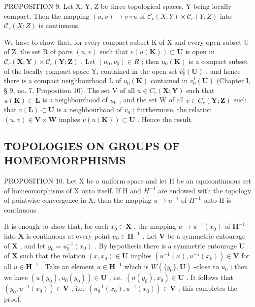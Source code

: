 PROPOSITION 9. Let X, Y, Z be three topological spaces, Y being locally compact. Then the mapping \((u, v) \to v \circ u\) of \(\mathcal{C}_c(X; Y) \times \mathcal{C}_c(Y; Z)\) into \(\mathcal{C}_c(X; Z)\) is continuous.

We have to show that, for every compact subset K of X and every open subset U of Z, the set R of pairs \((u, v)\) such that \(v(u(\mathbf{K})) \subset \mathbf{U}\) is open in \(\mathcal{C}_{c}(\mathbf{X}; \mathbf{Y}) \times \mathcal{C}_{c}(\mathbf{Y}; \mathbf{Z})\) . Let \((u_{0}, v_{0}) \in R\) ; then \(u_{0}(\mathbf{K})\) is a compact subset of the locally compact space Y, contained in the open set \(\overline{v}_{0}^{1}(\mathbf{U})\) , and hence there is a compact neighbourhood L of \(u_{0}(\mathbf{K})\) contained in \(\overline{v}_{0}^{1}(\mathbf{U})\) (Chapter I, § 9, no. 7, Proposition 10). The set V of all \(u \in C_{c}(\mathbf{X}; \mathbf{Y})\) such that \(u(\mathbf{K}) \subset \mathring{\mathbf{L}}\) is a neighbourhood of \(u_{0}\) , and the set W of all \(v \in C_{c}(\mathbf{Y}; \mathbf{Z})\) such that \(v(\mathbf{L}) \subset \mathbf{U}\) is a neighbourhood of \(v_{0}\) ; furthermore, the relation \((u, v) \in \mathbf{V} \times \mathbf{W}\) implies \(v(u(\mathbf{K})) \subset \mathbf{U}\) . Hence the result.

\subsection{TOPOLOGIES ON GROUPS OF HOMEOMORPHISMS}

PROPOSITION 10. Let X be a uniform space and let H be an equicontinuous set of homeomorphisms of X onto itself. If H and \(H^{-1}\) are endowed with the topology of pointwise convergence in X, then the mapping \(u \rightarrow u^{-1}\) of \(H^{-1}\) onto H is continuous.

It is enough to show that, for each \(x_0 \in \mathbf{X}\) , the mapping \(u \to u^{-1}(x_0)\) of \(\mathbf{H}^{-1}\) into \(\mathbf{X}\) is continuous at every point \(u_0 \in \mathbf{H}^{-1}\) . Let \(\mathbf{V}\) be a symmetric entourage of \(\mathbf{X}\) , and let \(y_0 = u_0^{-1}(x_0)\) . By hypothesis there is a symmetric entourage \(\mathbf{U}\) of \(\mathbf{X}\) such that the relation \((x, x_0) \in \mathbf{U}\) implies \((u^{-1}(x), u^{-1}(x_0)) \in \mathbf{V}\) for all \(u \in \mathbf{H}^{-1}\) . Take an element \(u \in \mathbf{H}^{-1}\) which is \(W(\{y_0\}, \mathbf{U})\) -close to \(u_0\) ; then we have \((u(y_0), u_0(y_0)) \in \mathbf{U}\) , i.e.~\((u(y_0), x_0) \in \mathbf{U}\) . It follows that \((y_0, u^{-1}(x_0)) \in \mathbf{V}\) , i.e.~\((u_0^{-1}(x_0), u^{-1}(x_0)) \in \mathbf{V}\) ; this completes the proof.

